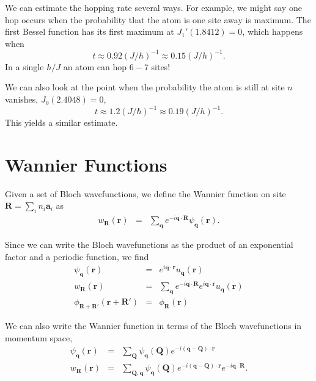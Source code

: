 \documentclass{article}
\theoremstyle{definition}
\begin{document}
We can estimate the hopping rate several ways. For example, we might say one hop occurs when the probability that the atom is one site away is maximum. The first Bessel function has its first maximum at $J_1'(1.8412) = 0$, which happens when 
\begin{equation}
t \approx 0.92 (J/\hbar)^{-1} \approx 0.15 (J/h)^{-1}.
\end{equation}
In a single $h/J$ an atom can hop $6-7$ sites!

We can also look at the point when the probability the atom is still at site $n$ vanishes, $J_0(2.4048) = 0$,
\begin{equation}
t \approx 1.2 (J/\hbar)^{-1} \approx 0.19 (J/h)^{-1}.
\end{equation}
This yields a similar estimate.

\section{Wannier Functions}

Given a set of Bloch wavefunctions, we define the Wannier function on site $\mathbf{R} = \sum_i n_i \mathbf{a}_i$ as
\begin{eqnarray}
w_\mathbf{R}(\mathbf{r}) &=& \sum_\mathbf{q} e^{-i \mathbf{q} \cdot \mathbf{R}} \psi_\mathbf{q}(\mathbf{r}).
\end{eqnarray}

Since we can write the Bloch wavefunctions as the product of an exponential factor and a periodic function, we find
\begin{eqnarray}
\psi_\mathbf{q}(\mathbf{r}) &=& e^{i\mathbf{q} \cdot \mathbf{r}} u_\mathbf{q}(\mathbf{r})\\
w_\mathbf{R}(\mathbf{r}) &=& \sum_\mathbf{q} e^{-i \mathbf{q} \cdot \mathbf{R}} e^{i\mathbf{q} \cdot \mathbf{r}} u_\mathbf{q}(\mathbf{r})\\
\phi_{\mathbf{R} + \mathbf{R}'}(\mathbf{r} + \mathbf{R}') &=& \phi_\mathbf{R}(\mathbf{r})
\end{eqnarray}

We can also write the Wannier function in terms of the Bloch wavefunctions in momentum space,
\begin{eqnarray}
\psi_\mathbf{q}( \mathbf{r} ) &=& \sum_\mathbf{Q} \psi_\mathbf{q} (\mathbf{Q}) e^{-i(\mathbf{q} - \mathbf{Q}) \cdot \mathbf{r}}\\
w_\mathbf{R}(\mathbf{r}) &=& \sum_{\mathbf{Q}, \mathbf{q}} \psi_\mathbf{q} (\mathbf{Q}) e^{-i(\mathbf{q} - \mathbf{Q}) \cdot \mathbf{r}} e^{-i \mathbf{q} \cdot \mathbf{R}}.
\end{eqnarray}
\end{document}
